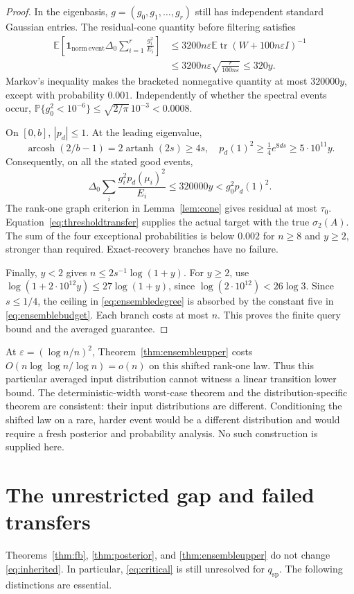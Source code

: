 \documentclass[11pt]{article}
\theoremstyle{definition}
\newcommand{\E}{\mathbb E}
\newcommand{\Prob}{\mathbb P}
\newcommand{\tr}{\operatorname{tr}}
\newcommand{\qsp}{q_{\mathrm{sp}}}
\begin{document}
\begin{proof}
In the eigenbasis, $g=(g_0,g_1,\ldots,g_r)$ still has independent standard Gaussian entries. The residual-cone quantity before filtering satisfies
\begin{align*}
\E\left[\boldsymbol1_{\mathrm{norm\ event}}\Delta_0
\sum_{i=1}^r\frac{g_i^2}{E_i}\right]
&\le3200n\varepsilon\E\tr(W+100n\varepsilon I)^{-1}\\
&\le3200n\varepsilon\sqrt{\frac{r}{100n\varepsilon}}
\le320y.
\end{align*}
Markov's inequality makes the bracketed nonnegative quantity at most $320000y$, except with probability $0.001$. Independently of whether the spectral events occur, $\Prob\{g_0^2<10^{-6}\}\le\sqrt{2/\pi}\,10^{-3}<0.0008$.

On $[0,b]$, $|p_d|\le1$. At the leading eigenvalue,
\[
\operatorname{arcosh}(2/b-1)=2\operatorname{artanh}(2s)\ge4s,
\quad p_d(1)^2\ge\tfrac14e^{8ds}\ge5\cdot10^{11}y.
\]
Consequently, on all the stated good events,
\[
\Delta_0\sum_i\frac{g_i^2p_d(\mu_i)^2}{E_i}
\le320000y<g_0^2p_d(1)^2.
\]
The rank-one graph criterion in Lemma~\ref{lem:cone} gives residual at most $\tau_0$. Equation~\eqref{eq:thresholdtransfer} supplies the actual target with the true $\sigma_2(A)$. The sum of the four exceptional probabilities is below $0.002$ for $n\ge8$ and $y\ge2$, stronger than required. Exact-recovery branches have no failure.

Finally, $y<2$ gives $n\le2s^{-1}\log(1+y)$. For $y\ge2$, use
$\log(1+2\cdot10^{12}y)\le27\log(1+y)$, since $\log(2\cdot10^{12})<26\log3$. Since $s\le1/4$, the ceiling in \eqref{eq:ensembledegree} is absorbed by the constant five in \eqref{eq:ensemblebudget}. Each branch costs at most $n$. This proves the finite query bound and the averaged guarantee.
\end{proof}

At $\varepsilon=(\log n/n)^2$, Theorem~\ref{thm:ensembleupper} costs
$O(n\log\log n/\log n)=o(n)$ on this shifted rank-one law. Thus this particular averaged input distribution cannot witness a linear transition lower bound. The deterministic-width worst-case theorem and the distribution-specific theorem are consistent: their input distributions are different. Conditioning the shifted law on a rare, harder event would be a different distribution and would require a fresh posterior and probability analysis. No such construction is supplied here.

\section{The unrestricted gap and failed transfers}\label{sec:missing}
Theorems~\ref{thm:fb}, \ref{thm:posterior}, and \ref{thm:ensembleupper} do not change \eqref{eq:inherited}. In particular, \eqref{eq:critical} is still unresolved for $\qsp$. The following distinctions are essential.
\end{document}
